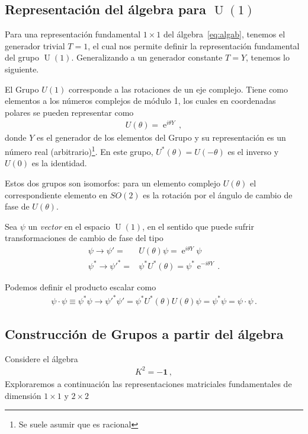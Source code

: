 \subsection{Representación del álgebra para $\operatorname{U}(1)$}
Para una representación fundamental $1\times 1$ del álgebra~\eqref{eq:algab}, tenemos el generador trivial $T=1$, el cual nos permite definir la representación fundamental del grupo  $\operatorname{U}(1)$. Generalizando a un generador constante $T=Y$, tenemos lo siguiente.



 El Grupo $U(1)$ corresponde a las rotaciones de un eje complejo. Tiene como elementos a los números complejos de módulo 1, 
 los cuales en coordenadas polares se pueden representar como
\begin{align}
  U(\theta)=\operatorname{e}^{i \theta Y}\,,
\end{align}
donde $Y$ es el generador de los elementos del Grupo y su representación es un número real (arbitrario)\footnote{Se suele asumir que es racional}.  En este grupo, $U^{*}(\theta)=U(-\theta)$ es el inverso y $U(0)$ es la identidad.

Estos dos grupos son isomorfos: para un elemento complejo $U(\theta)$ el correspondiente elemento en $SO(2)$ es la rotación por el ángulo de cambio de fase de $U(\theta)$.

\begin{frame}
Sea $\psi$ un \emph{vector} en el espacio $\operatorname{U}(1)$, en el sentido que puede sufrir transformaciones de cambio de fase del tipo
\begin{align}
  \psi\to \psi'=& U(\theta)\psi= \operatorname{e}^{i \theta Y}\psi \nonumber\\
  \psi^{*}\to {\psi'}^{*}=&\psi^{*} U^{*}(\theta)=\psi^{*}\operatorname{e}^{-i \theta Y}\,.
\end{align}


Podemos definir el producto escalar como
\begin{align}
  \psi\cdot \psi\equiv\psi^{*} \psi
  \to {\psi'}^{*} \psi'=\psi^{*} U^{*}(\theta) U(\theta) \psi=\psi^{*} \psi=\psi\cdot \psi\,.
\end{align}
\end{frame}

\subsection{Construcción de Grupos a partir del álgebra}
\begin{frame}
Considere el álgebra
\begin{align}
  K^2=-\boldsymbol{1}\,,
\end{align}
Exploraremos a continuación las representaciones matriciales fundamentales de dimensión $1\times1$ y $2\times2$

\end{frame}
